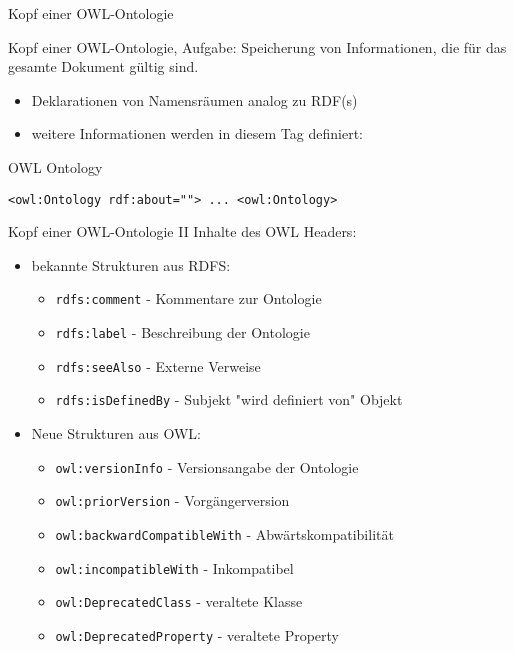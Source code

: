\documentclass{beamer}
\begin{document}
\begin{frame}[fragile]{Kopf einer OWL-Ontologie}
\begin{block}{Kopf einer OWL-Ontologie, Aufgabe:}
Speicherung von Informationen, die für das gesamte Dokument gültig sind.
\end{block}
\begin{itemize}
	\item Deklarationen von Namensräumen analog zu RDF(s)
	\item weitere Informationen werden in diesem  Tag definiert: 
\end{itemize}
\begin{block}{OWL Ontology}
\begin{lstlisting}[lang="xml"]
<owl:Ontology rdf:about=""> ... <owl:Ontology>
\end{lstlisting}
\end{block}
\end{frame}

\begin{frame}{Kopf einer OWL-Ontologie II}
Inhalte des OWL Headers:
\begin{itemize}
	\item bekannte Strukturen aus RDFS:
	\begin{itemize}
		\item  \texttt{rdfs:comment} - Kommentare zur Ontologie
		\item  \texttt{rdfs:label} - Beschreibung der Ontologie
		\item  \texttt{rdfs:seeAlso} - Externe Verweise
		\item  \texttt{rdfs:isDefinedBy} - Subjekt "wird definiert von" Objekt
	\end{itemize}
\end{itemize}
\begin{itemize}
	\item Neue Strukturen aus OWL:
	\begin{itemize}
		\item \texttt{owl:versionInfo} - Versionsangabe der Ontologie
		\item \texttt{owl:priorVersion} - Vorgängerversion
		\item \texttt{owl:backwardCompatibleWith} - Abwärtskompatibilität
		\item \texttt{owl:incompatibleWith} - Inkompatibel
		\item \texttt{owl:DeprecatedClass} - veraltete Klasse
		\item \texttt{owl:DeprecatedProperty} - veraltete Property
	\end{itemize}
\end{itemize}
\end{frame}
\end{document}
